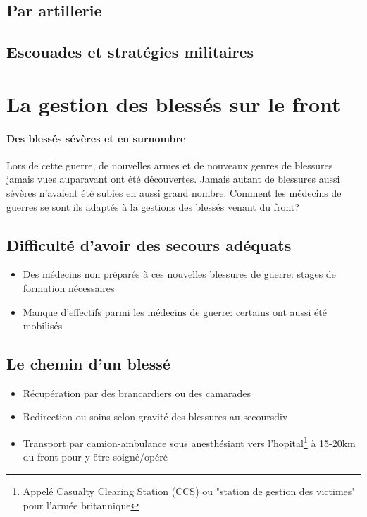 \documentclass[a4paper, BCOR=0mm, fontsize=12pt, titlepage=firstiscover]{scrreprt}
\begin{document}
		\subsection{Par artillerie}
		\subsection{Escouades et stratégies militaires}
	
	\newpage
	\section{La gestion des blessés sur le front}
		\paragraph{Des blessés sévères et en surnombre}
		Lors de cette guerre, de nouvelles armes et de nouveaux genres de blessures jamais vues auparavant ont été découvertes.
		Jamais autant de blessures aussi sévères n'avaient été subies en aussi grand nombre.
		Comment les médecins de guerres se sont ils adaptés à la gestions des blessés venant du front?
		
		\subsection{Difficulté d'avoir des secours adéquats}
			\begin{itemize}
				\item Des médecins non préparés à ces nouvelles blessures de guerre: stages de formation nécessaires\cite{manquedeffectif}
				\item Manque d'effectifs parmi les médecins de guerre: certains ont aussi été mobilisés\cite{manquedeffectif}
			\end{itemize}
		\subsection{Le chemin d'un blessé}
			\begin{itemize}
				\item Récupération par des \glspl{brancardier} ou des camarades\cite{medicineintrenches}
				\item Redirection ou soins selon gravité des blessures au \gls{secoursdiv}\cite{medicineintrenches}
				\item Transport par camion-ambulance sous anesthésiant vers l'\Gls{hopital}\footnote{Appelé Casualty Clearing Station (CCS) ou "station de gestion des victimes" pour l'armée britannique}\cite{brancardiers}\cite{medicineintrenches} à 15-20km du front pour y être soigné/opéré

			\end{itemize}
\end{document}

